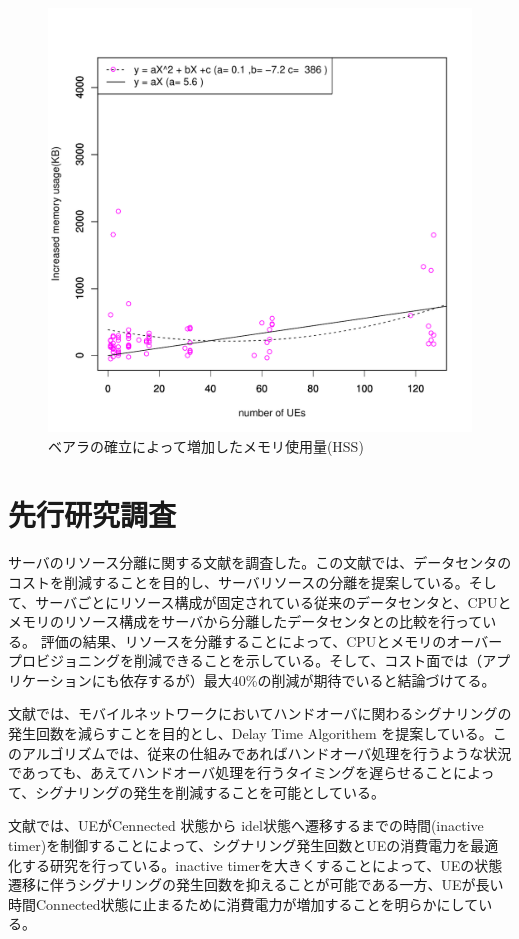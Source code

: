 \documentclass[a4j]{ujarticle}
\begin{document}
\begin{figure}[htbp]
	\centering
	\includegraphics[width=0.7\hsize]{hss_memory.pdf}
  \caption{ベアラの確立によって増加したメモリ使用量(HSS)}
	\label{hss_memory}
\end{figure}

\clearpage



\section{先行研究調査}
サーバのリソース分離に関する文献\cite{TechnoEconomicFrameworkforCloudInfrastructureACostStudyofResourceDisaggregation}を調査した。この文献では、データセンタのコストを削減することを目的し、サーバリソースの分離を提案している。そして、サーバごとにリソース構成が固定されている従来のデータセンタと、CPUとメモリのリソース構成をサーバから分離したデータセンタとの比較を行っている。
評価の結果、リソースを分離することによって、CPUとメモリのオーバープロビジョニングを削減できることを示している。そして、コスト面では（アプリケーションにも依存するが）最大40\%の削減が期待でいると結論づけてる。

文献\cite{ModelingDelayTimerAlgorithmforHandoverReductioninHeterogeneousRadioAccessNetworks}では、モバイルネットワークにおいてハンドオーバに関わるシグナリングの発生回数を減らすことを目的とし、Delay Time Algorithem を提案している。このアルゴリズムでは、従来の仕組みであればハンドオーバ処理を行うような状況であっても、あえてハンドオーバ処理を行うタイミングを遅らせることによって、シグナリングの発生を削減することを可能としている。

文献\cite{ModelingofMobilityAwareRRCStateTransitionforEnergyConstrainedSignalingReduction}では、UEがCennected 状態から idel状態へ遷移するまでの時間(inactive timer)を制御することによって、シグナリング発生回数とUEの消費電力を最適化する研究を行っている。inactive timerを大きくすることによって、UEの状態遷移に伴うシグナリングの発生回数を抑えることが可能である一方、UEが長い時間Connected状態に止まるために消費電力が増加することを明らかにしている。
\end{document}
